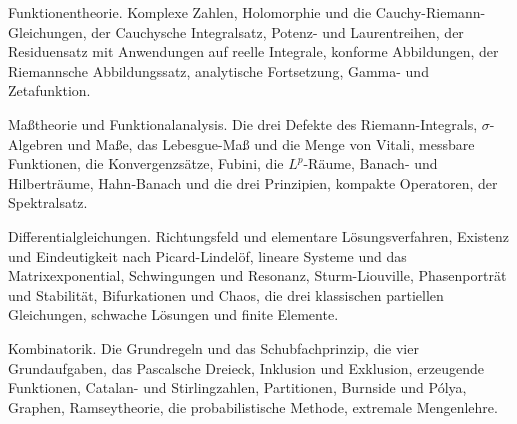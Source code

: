 \begin{merksatz}
Funktionentheorie. Komplexe Zahlen, Holomorphie und die Cauchy-Riemann-Gleichungen, der Cauchysche Integralsatz, Potenz- und Laurentreihen, der Residuensatz mit Anwendungen auf reelle Integrale, konforme Abbildungen, der Riemannsche Abbildungssatz, analytische Fortsetzung, Gamma- und Zetafunktion.

\end{merksatz}

\begin{merksatz}
Maßtheorie und Funktionalanalysis. Die drei Defekte des Riemann-Integrals, $\sigma$-Algebren und Maße, das Lebesgue-Maß und die Menge von Vitali, messbare Funktionen, die Konvergenzsätze, Fubini, die $L^{p}$-Räume, Banach- und Hilberträume, Hahn-Banach und die drei Prinzipien, kompakte Operatoren, der Spektralsatz.

\end{merksatz}

\begin{merksatz}
Differentialgleichungen. Richtungsfeld und elementare Lösungsverfahren, Existenz und Eindeutigkeit nach Picard-Lindelöf, lineare Systeme und das Matrixexponential, Schwingungen und Resonanz, Sturm-Liouville, Phasenporträt und Stabilität, Bifurkationen und Chaos, die drei klassischen partiellen Gleichungen, schwache Lösungen und finite Elemente.

\end{merksatz}

\begin{merksatz}
Kombinatorik. Die Grundregeln und das Schubfachprinzip, die vier Grundaufgaben, das Pascalsche Dreieck, Inklusion und Exklusion, erzeugende Funktionen, Catalan- und Stirlingzahlen, Partitionen, Burnside und Pólya, Graphen, Ramseytheorie, die probabilistische Methode, extremale Mengenlehre.

\end{merksatz}

